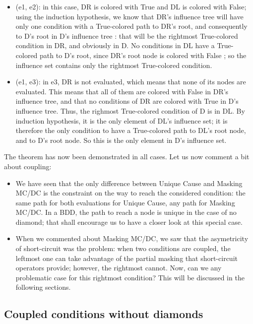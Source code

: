 \documentclass[a4paper,12pt,twoside]{article}
\begin{document}
\begin{itemize}
\begin{itemize}
\item (e1, e2): in this case, DR is colored with True and DL is colored with
False; using the induction hypothesis, we know that DR's influence tree
will have only one condition with a True-colored path to DR's root, and
consequently to D's root in D's influence tree : that will be the rightmost
True-colored condition in DR, and obviously in D. No conditions in DL
have a True-colored path to D's root, since DR's root node is colored with
False ; so the influence set contains only the rightmost True-colored
condition.
\item (e1, e3): in e3, DR is not evaluated, which means that none of its
nodes are evaluated. This means that all of them are colored with
False in DR's influence tree, and that no conditions of DR are colored
with True in D's influence tree. Thus, the righmost True-colored condition
of D is in DL. By induction hypothesis, it is the only element of DL's
influence set; it is therefore the only condition to have a True-colored
path to DL's root node, and to D's root node. So this is the only element
in D's influence set.
\end{itemize}

\end{itemize}

The theorem has now been demonstrated in all cases. Let us now comment
a bit about coupling:
\begin{itemize}

\item We have seen that the only difference between Unique Cause and
Masking MC/DC is the constraint on the way to reach the considered
condition: the same path for both evaluations for Unique Cause, any
path for Masking MC/DC. In a BDD, the path to reach a node is unique
in the case of no diamond; that shall encourage us to have a closer
look at this special case.

\item When we commented about Masking MC/DC, we saw that the
asymetricity of short-circuit was the problem: when two conditions are
coupled, the leftmost one can take advantage of the partial masking that
short-circuit operators provide; however, the rightmost cannot. Now,
can we any problematic case for this rightmost condition? This will be
discussed in the following sections.
\end{itemize}


\subsection{Coupled conditions without diamonds}
\end{document}
